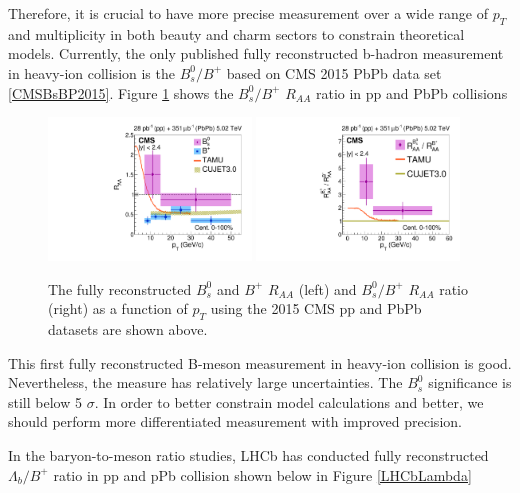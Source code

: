 


Therefore, it is crucial to have more precise measurement over a wide range of $p_T$ and multiplicity in both beauty and charm sectors to constrain theoretical models. Currently, the only published fully reconstructed b-hadron measurement in heavy-ion collision is the $B^0_s/B^+$ based on CMS 2015 PbPb data set \ref{CMSBsBP2015}. Figure \ref{BsBP2015} shows the $B^0_s/B^+$ $R_{AA}$ ratio in pp and PbPb collisions

\begin{figure}[hbtp]
\begin{center}
\includegraphics[width=0.48\textwidth]{Figures/Chapter2/CMSBsBPRAA2015.pdf}
\includegraphics[width=0.48\textwidth]{Figures/Chapter2/CMSBsBP2015.pdf}
\caption{The fully reconstructed $B^0_s$ and $B^+$ $R_{AA}$ (left) and $B^0_s/B^+$ $R_{AA}$ ratio (right) as a function of $p_T$ using the 2015 CMS pp and PbPb datasets are shown above.}
\label{BsBP2015}
\end{center}
\end{figure}   

This first fully reconstructed B-meson measurement in heavy-ion collision is good. Nevertheless, the measure has relatively large uncertainties. The $B^0_s$ significance is still below 5 $\sigma$. In order to better constrain model calculations and better, we should perform more differentiated measurement with improved precision. 

In the baryon-to-meson ratio studies, LHCb has conducted fully reconstructed $\Lambda_b/B^+$ ratio in pp and pPb collision \cite{LHCbLambdaB} shown below in Figure \ref{LHCbLambda}


